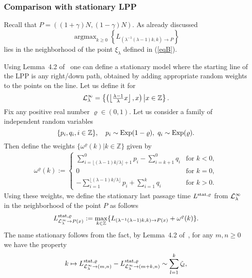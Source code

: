 \documentclass[12pt,a4paper]{article}
\numberwithin{equation}{section}
\newcommand{\Z}{\mathbb{Z}}
\DeclareMathOperator\argmax{argmax}
\begin{document}
\subsubsection{Comparison with stationary LPP}
Recall that $P=\left((1+\gamma)N, (1-\gamma)N\right)$. As already discussed
\begin{equation}
\argmax_{k\geq 0}\left\{L_{\left(\lambda^{-1}(\lambda-1) k, k\right)\to P}\right\}
\end{equation}
lies in the neighborhood of the point $\xi_\lambda$ defined in (\ref{eqB}).

Using Lemma~4.2 of~\cite{BCS06} one can define a stationary model where the starting line of the LPP is any right/down path, obtained by adding appropriate random weights to the points on the line. Let us define it for
\begin{equation}
{\cal L}^\infty_\lambda=\left\{\left(\left\lfloor\tfrac{\lambda-1}{\lambda} x\right\rfloor, x\right)\big| x\in \Z\right\}.
\end{equation}
Fix any positive real number $\varrho\in (0,1)$. Let us consider a family of independent random variables
\begin{equation}
\{p_i,q_i,i\in\Z\},\quad p_i\sim {\rm Exp}(1-\varrho),\ q_i\sim {\rm Exp}(\varrho).
\end{equation}
Then define the weights $\{\omega^{\varrho}(k)\big| k\in \Z\}$ given by
\begin{align}\label{eq:RandomWeightsAlongAntiDiagonal}
\omega^{\varrho}(k):= \left\{\begin{array}{ll}
\sum_{i=\lfloor (\lambda-1) k/\lambda\rfloor+1}^0 p_i-\sum_{i=k+1}^0 q_i & \text{for } k<0,\\
0 & \text{for } k=0,\\
-\sum_{i=1}^{\lfloor (\lambda-1) k/\lambda\rfloor} p_i+\sum_{i=1}^k q_i & \text{for } k>0.
\end{array}\right.
\end{align}
Using these weights, we define the stationary last passage time $L^{{\rm stat},\varrho}$ from ${\cal L}^\infty_\lambda$ in the neighborhood of the point $P$ as follows
\begin{align}\label{eq:LastPassageTimeFromLHalf}
L^{{\rm stat},\varrho}_{{\cal L}^\infty_\lambda\to P(x)} := \max_{k\in\Z}\{L_{\left(\lambda^{-1}(\lambda-1)k,k\right)\to P(x)}+\omega^{\varrho}(k)\}.
\end{align}
The name stationary follows from the fact, by Lemma~4.2 of~\cite{BCS06}, for any $m,n\geq 0$ we have the property
\begin{equation}\label{eq:StatProperty}
k\mapsto L^{{\rm stat},\varrho}_{{\cal L}^\infty_\lambda\to (m,n)}-L^{{\rm stat},\varrho}_{{\cal L}^\infty_\lambda\to (m+k,n)}\sim \sum_{l=1}^k \zeta_l,
\end{equation}
\end{document}
